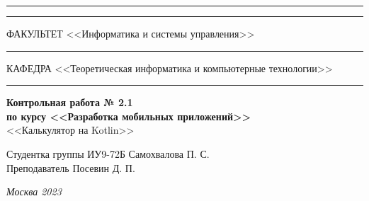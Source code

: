 \documentclass[a4paper, 14pt]{extarticle}
\begin{document}
\begin{titlepage}
\vspace{-25pt}
\hspace{-35pt}\rule{\textwidth}{2.3pt}

\vspace*{-20.3pt}
\hspace{-35pt}\rule{\textwidth}{0.4pt}

\vspace{1.5ex}
\hspace{-35pt} \noindent \small ФАКУЛЬТЕТ\hspace{80pt} <<Информатика и системы управления>>

\vspace*{-16pt}
\hspace{47pt}\rule{0.83\textwidth}{0.4pt}

\vspace{0.5ex}
\hspace{-35pt} \noindent \small КАФЕДРА\hspace{50pt} <<Теоретическая информатика и компьютерные технологии>>

\vspace*{-16pt}
\hspace{30pt}\rule{0.866\textwidth}{0.4pt}
  
\vspace{11em}

\begin{center}
\Large {\bf Контрольная работа № 2.1} \\
\large {\bf по курсу <<Разработка мобильных приложений>>} \\
\large <<Калькулятор на Kotlin>>
\end{center}\normalsize

\vspace{8em}


\begin{flushright}
  {Студентка группы ИУ9-72Б Самохвалова П. С. \hspace*{15pt}\\
  \vspace{2ex}
  Преподаватель Посевин Д. П.\hspace*{15pt}}
\end{flushright}

\bigskip

\vfill
 

\begin{center}
\textsl{Москва 2023}
\end{center}
\end{titlepage}
\end{document}
